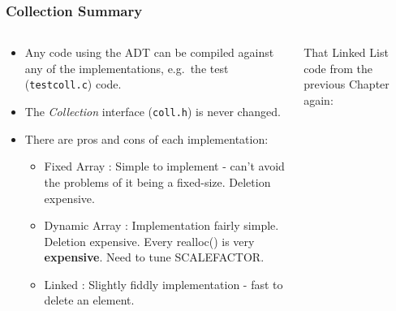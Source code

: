 
\begin{frame}[fragile]
\frametitle{Collection Summary}
\begin{columns}[T]

\begin{column}{0.45\textwidth}
\begin{itemize}[<+->]
\item Any code using the ADT can be compiled against any of the implementations, e.g.~the test (\verb^testcoll.c^) code. 
\item The {\em Collection} interface ({\verb^coll.h^}) is never changed.
\item There are pros and cons of each implementation:
\begin{itemize}
\item Fixed Array : Simple to implement - can't avoid the problems of it being a fixed-size. Deletion expensive.
\item Dynamic Array : Implementation fairly simple. Deletion expensive. Every realloc() is very {\bf expensive}. Need to tune SCALEFACTOR.
\item Linked : Slightly fiddly implementation - fast to delete an element.
\end{itemize}
\end{itemize}
\end{column}

\pause
\begin{column}{0.45\textwidth}
That Linked List code from the previous Chapter again:

\end{column}

\end{columns}
\end{frame}


\endinput
